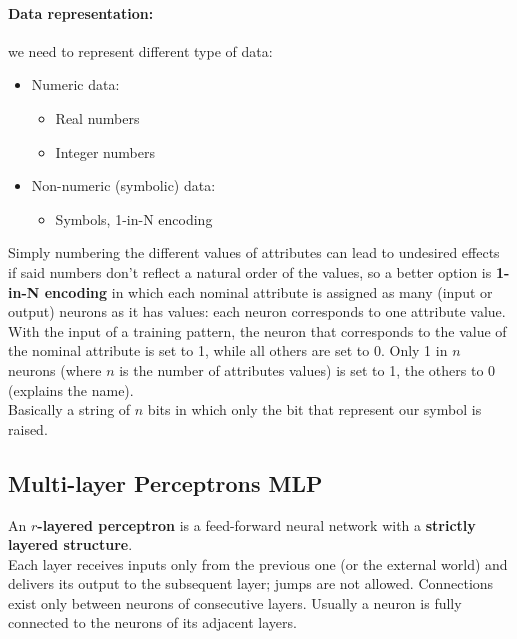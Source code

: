 \paragraph{Data representation:} we need to represent different type of data: 
\begin{itemize}
	\item Numeric data: 
	\begin{itemize}
		\item Real numbers 
		\item Integer numbers
	\end{itemize}
	\nn
	
	\item Non-numeric (symbolic) data: 
	\begin{itemize}
		\item Symbols, 1-in-N encoding
	\end{itemize}
\end{itemize}

Simply numbering the different values of attributes can lead to undesired effects if said numbers don't reflect a natural order of the values, so a better option is \textbf{1-in-N encoding} in which each nominal attribute is assigned as many (input or output) neurons as it has values: each neuron corresponds to one attribute value.\\

With the input of a training pattern, the neuron that corresponds to the value of the nominal attribute is set to 1, while all others are set to 0. Only 1 in $n$ neurons (where $n$ is the number of attributes values) is set to 1, the others to 0 (explains the name).\\
Basically a string of $n$ bits in which only the bit that represent our symbol is raised.\\


\newpage

\subsection{Multi-layer Perceptrons MLP}
An \textbf{$r$-layered perceptron} is a feed-forward neural network with a \textbf{strictly layered structure}.\\

Each layer receives inputs only from the previous one (or the external world) and delivers its output to the subsequent layer; jumps are not allowed. Connections exist only between neurons of consecutive layers. Usually a neuron is fully connected to the neurons of its adjacent layers.\\


